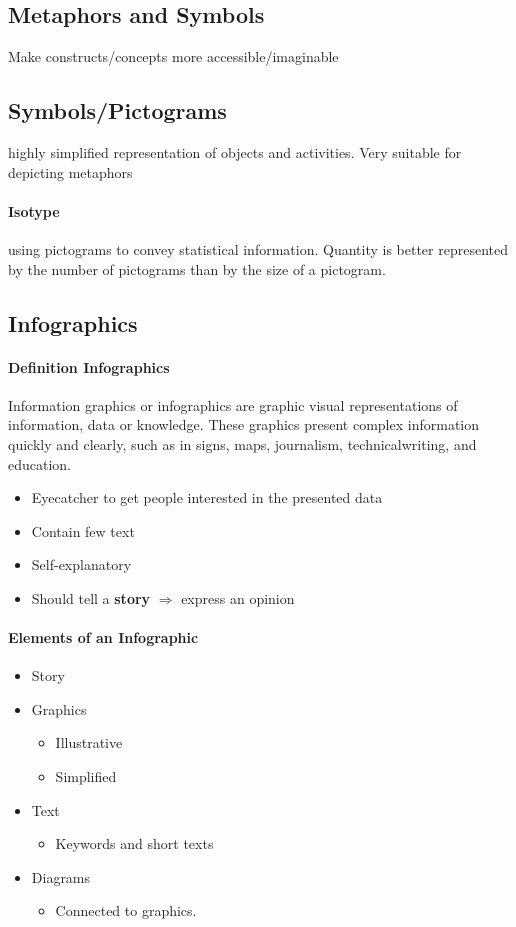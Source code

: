 \documentclass[10pt,a4paper]{article}
\begin{document}
	\subsection{Metaphors and Symbols}
	Make constructs/concepts more accessible/imaginable
	
	\subsection{Symbols/Pictograms}
	highly simplified representation of objects and activities. Very suitable for depicting metaphors
	
	\paragraph{Isotype} using pictograms to convey statistical information. Quantity is better represented by the number of pictograms than by the size of a pictogram.
	
	\subsection{Infographics}
	
	\paragraph{Definition Infographics} Information graphics or infographics are graphic visual representations of information, data or knowledge. These graphics present complex information quickly and clearly, such as in signs, maps, journalism, technicalwriting, and education.
	
	\begin{itemize}
		\item Eyecatcher to get people interested in the presented data
		\item Contain few text
		\item Self-explanatory
		\item Should tell a \textbf{story} $ \Rightarrow $ express an opinion
	\end{itemize}

	\paragraph{Elements of an Infographic}
	\begin{itemize}
		\item Story
		\item Graphics
		\begin{itemize}
			\item Illustrative
			\item Simplified
		\end{itemize}
		\item Text
		\begin{itemize}
			\item Keywords and short texts
		\end{itemize}
		\item Diagrams
		\begin{itemize}
			\item Connected to graphics.
		\end{itemize}
	\end{itemize}
\end{document}

